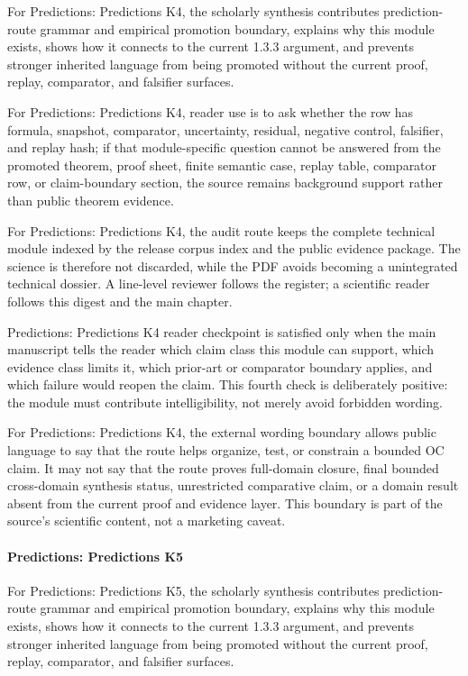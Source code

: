 For Predictions: Predictions K4, the scholarly synthesis contributes prediction-route grammar and empirical promotion boundary, explains why this module exists, shows how it connects to the current 1.3.3 argument, and prevents stronger inherited language from being promoted without the current proof, replay, comparator, and falsifier surfaces.


For Predictions: Predictions K4, reader use is to ask whether the row has formula, snapshot, comparator, uncertainty, residual, negative control, falsifier, and replay hash; if that module-specific question cannot be answered from the promoted theorem, proof sheet, finite semantic case, replay table, comparator row, or claim-boundary section, the source remains background support rather than public theorem evidence.


For Predictions: Predictions K4, the audit route keeps the complete technical module indexed by the release corpus index and the public evidence package. The science is therefore not discarded, while the PDF avoids becoming a unintegrated technical dossier. A line-level reviewer follows the register; a scientific reader follows this digest and the main chapter.


Predictions: Predictions K4 reader checkpoint is satisfied only when the main manuscript tells the reader which claim class this module can support, which evidence class limits it, which prior-art or comparator boundary applies, and which failure would reopen the claim. This fourth check is deliberately positive: the module must contribute intelligibility, not merely avoid forbidden wording.


For Predictions: Predictions K4, the external wording boundary allows public language to say that the route helps organize, test, or constrain a bounded OC claim. It may not say that the route proves full-domain closure, final bounded cross-domain synthesis status, unrestricted comparative claim, or a domain result absent from the current proof and evidence layer. This boundary is part of the source's scientific content, not a marketing caveat.


\paragraph{Predictions: Predictions K5}

For Predictions: Predictions K5, the scholarly synthesis contributes prediction-route grammar and empirical promotion boundary, explains why this module exists, shows how it connects to the current 1.3.3 argument, and prevents stronger inherited language from being promoted without the current proof, replay, comparator, and falsifier surfaces.


